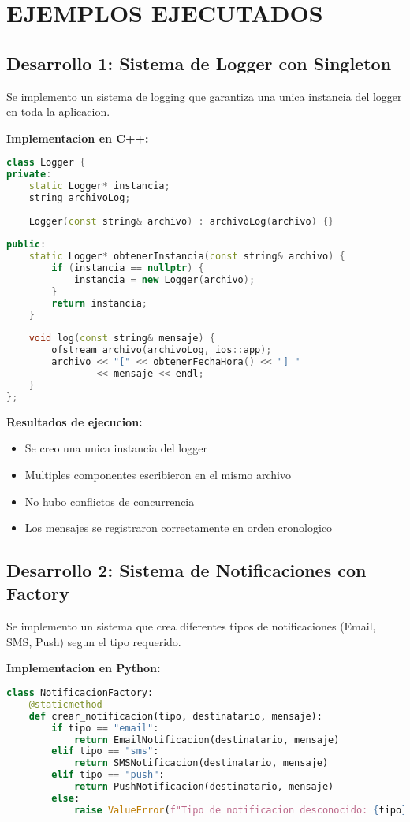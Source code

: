 \documentclass[11pt,a4paper]{article}
\begin{document}
\section{EJEMPLOS EJECUTADOS}

\subsection{Desarrollo 1: Sistema de Logger con Singleton}

Se implemento un sistema de logging que garantiza una unica instancia del logger en toda la aplicacion.

\textbf{Implementacion en C++:}
\begin{lstlisting}[language=C++, caption=Logger Singleton en C++]
class Logger {
private:
    static Logger* instancia;
    string archivoLog;
    
    Logger(const string& archivo) : archivoLog(archivo) {}
    
public:
    static Logger* obtenerInstancia(const string& archivo) {
        if (instancia == nullptr) {
            instancia = new Logger(archivo);
        }
        return instancia;
    }
    
    void log(const string& mensaje) {
        ofstream archivo(archivoLog, ios::app);
        archivo << "[" << obtenerFechaHora() << "] " 
                << mensaje << endl;
    }
};
\end{lstlisting}

\textbf{Resultados de ejecucion:}
\begin{itemize}
    \item Se creo una unica instancia del logger
    \item Multiples componentes escribieron en el mismo archivo
    \item No hubo conflictos de concurrencia
    \item Los mensajes se registraron correctamente en orden cronologico
\end{itemize}

\subsection{Desarrollo 2: Sistema de Notificaciones con Factory}

Se implemento un sistema que crea diferentes tipos de notificaciones (Email, SMS, Push) segun el tipo requerido.

\textbf{Implementacion en Python:}
\begin{lstlisting}[language=Python, caption=Factory de Notificaciones en Python]
class NotificacionFactory:
    @staticmethod
    def crear_notificacion(tipo, destinatario, mensaje):
        if tipo == "email":
            return EmailNotificacion(destinatario, mensaje)
        elif tipo == "sms":
            return SMSNotificacion(destinatario, mensaje)
        elif tipo == "push":
            return PushNotificacion(destinatario, mensaje)
        else:
            raise ValueError(f"Tipo de notificacion desconocido: {tipo}")
\end{lstlisting}
\end{document}
